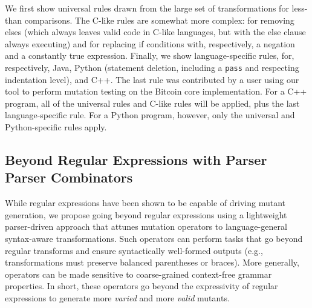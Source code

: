 \documentclass[acmsmall]{acmart}
\begin{document}
{We first show universal rules drawn from the large set of transformations for
less-than comparisons.  The C-like rules are somewhat more
complex: for removing elses (which always leaves valid code in
C-like languages, but with the else clause always executing) and for
replacing if conditions with, respectively, a negation and a
constantly true expression.  Finally, we show
language-specific rules, for, respectively, Java, Python (statement
deletion, including a {\tt pass} and respecting indentation level),
and C++.  The last rule was contributed by a user using our tool to
perform mutation testing on the Bitcoin core implementation.  For a
C++ program, all of the universal rules and C-like rules will be
applied, plus the last language-specific rule.  For a Python
program, however, only the universal and Python-specific rules apply.


\subsection{Beyond Regular Expressions with Parser Parser Combinators}




While regular expressions have been shown to be capable of driving mutant generation, we
propose going beyond regular expressions using a lightweight
parser-driven approach that attunes mutation operators to
language-general syntax-aware transformations. Such operators can
perform tasks that go beyond regular transforms and ensure
syntactically well-formed outputs (e.g., transformations must preserve
balanced parentheses or braces). More generally, operators can be made
sensitive to coarse-grained context-free grammar properties. In short,
these
operators go beyond the expressivity of regular expressions to generate more
\emph{varied} and more \emph{valid} mutants.

}
\end{document}
